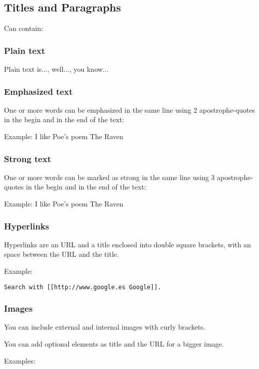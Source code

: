 \documentclass[a4paper,11pt]{article}
\begin{document}
\subsection{Titles and Paragraphs }
Can contain:

\subsubsection{Plain text}
Plain text is..., well..., you know...

\subsubsection{Emphasized text}
One or more words can be emphasized in the same line using 2 
apostrophe-quotes in the begin and in the end of the text:

Example: I like Poe's poem The Raven

\subsubsection{Strong text}
One or more words can be marked as strong in the same line 
using 3 apostrophe-quotes in the begin and in the end of the text:

Example: I like Poe's poem The Raven

\subsubsection{Hyperlinks}
Hyperlinks are an URL and a title enclosed into double square
brackets, with an space between the URL and the title.

Example:

\begin{verbatim}
Search with [[http://www.google.es Google]].
\end{verbatim}
\subsubsection{Images}
You can include external and internal images with curly brackets.	

You can add optional elements as title and the URL for a bigger image.

Examples: 
\end{document}
